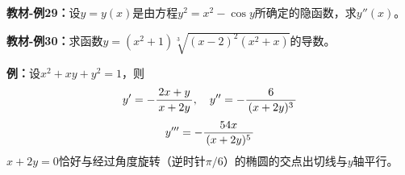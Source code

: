 {\bf 教材-例29：}设$y=y(x)$是由方程$y^2=x^2-\cos y$所确定的隐函数，求$y''(x)$。

\begin{center}
\end{center}

{\bf 教材-例30：}求函数$y=(x^2+1)\sqrt[3]{(x-2)^2(x^2+x)}$的导数。

{\bf 例：}设$x^2+xy+y^2=1$，则
$$y'=-\displaystyle\frac{\,{2x+y}\,}{\,{x+2y}\,},\quad y''=-\displaystyle\frac{\,{6}\,}{\,{(x+2y)^3}\,}$$
$$y'''=-\displaystyle\frac{\,{54x}\,}{\,{(x+2y)^5}\,}$$
$x+2y=0$恰好与经过角度旋转（逆时针$\pi/6$）的椭圆的交点出切线与$y$轴平行。

